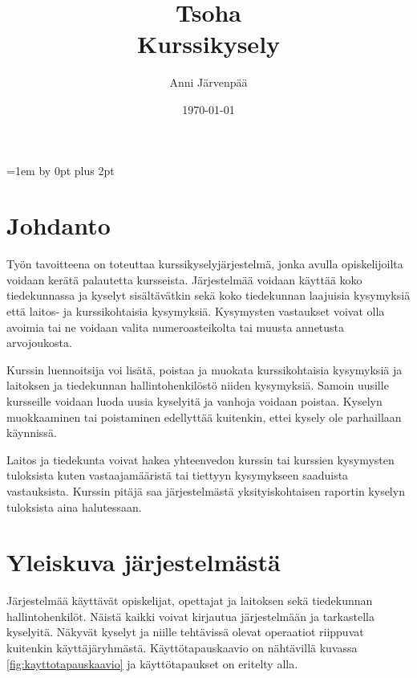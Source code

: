 \documentclass[12pt,a4paper,titlepage]{article}
\title{Tsoha\\ Kurssikysely \vspace{0.5em}}
\author{Anni Järvenpää}
\date{\today}
\begin{document}
\maketitle

\newpage
\tableofcontents
\thispagestyle{empty}
\newpage
\setcounter{page}{1}
\parskip=1em \advance\parskip by 0pt plus 2pt
\pagestyle{fancy}
\cfoot{\thepage}

\section{Johdanto}
Työn tavoitteena on toteuttaa kurssikyselyjärjestelmä, jonka avulla opiskelijoilta voidaan kerätä palautetta kursseista. Järjestelmää voidaan käyttää koko tiedekunnassa ja kyselyt sisältävätkin sekä koko tiedekunnan laajuisia kysymyksiä että laitos- ja kurssikohtaisia kysymyksiä. Kysymysten vastaukset voivat olla avoimia tai ne voidaan valita numeroasteikolta tai muusta annetusta arvojoukosta.

Kurssin luennoitsija voi lisätä, poistaa ja muokata kurssikohtaisia kysymyksiä ja laitoksen ja tiedekunnan hallintohenkilöstö niiden kysymyksiä. Samoin uusille kursseille voidaan luoda uusia kyselyitä ja vanhoja voidaan poistaa. Kyselyn muokkaaminen tai poistaminen edellyttää kuitenkin, ettei kysely ole parhaillaan käynnissä.

Laitos ja tiedekunta voivat hakea yhteenvedon kurssin tai kurssien kysymysten tuloksista kuten vastaajamääristä tai tiettyyn kysymykseen saaduista vastauksista. Kurssin pitäjä saa järjestelmästä yksityiskohtaisen raportin kyselyn tuloksista aina halutessaan.


\section{Yleiskuva järjestelmästä}
Järjestelmää käyttävät opiskelijat, opettajat ja laitoksen sekä tiedekunnan hallintohenkilöt. Näistä kaikki voivat kirjautua järjestelmään ja tarkastella kyselyitä. Näkyvät kyselyt ja niille tehtävissä olevat operaatiot riippuvat kuitenkin käyttäjäryhmästä. Käyttö\-tapaus\-kaavio on nähtävillä kuvassa \ref{fig:kayttotapauskaavio} ja käyttötapaukset on eritelty alla.
\end{document}
